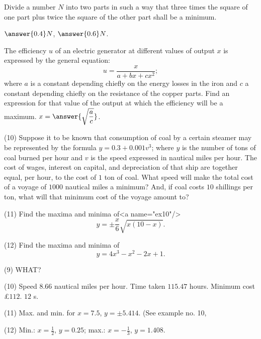\documentclass{ximera}
\begin{document}
\begin{problem} Divide a number $N$ into two parts in such a
way that three times the square of one part plus
twice the square of the other part shall be a
minimum.

$\answer{0.4}N$, $\answer{0.6}N$.
\end{problem}

\begin{problem}The efficiency $u$ of an electric generator at
different values of output $x$ is expressed by the
general equation:
\[
u=\frac{x}{a+bx+cx^2};
\]
where $a$ is a constant depending chiefly on the energy
losses in the iron and $c$ a constant depending chiefly
on the resistance of the copper parts. Find an expression
for that value of the output at which the
efficiency will be a maximum.
 $x = \answer{\sqrt{\dfrac{a}{c}}}$.
\end{problem}

(10) Suppose it to be known that consumption of
coal by a certain steamer may be represented by the
formula $y = 0.3 + 0.001v^3$; where $y$ is the number of
tons of coal burned per hour and $v$ is the speed
expressed in nautical miles per hour. The cost of
wages, interest on capital, and depreciation of that
ship are together equal, per hour, to the cost of
$1$ ton of coal. What speed will make the total cost
of a voyage of $1000$ nautical miles a minimum?
And, if coal costs $10$ shillings per ton, what will that
minimum cost of the voyage amount to?

(11) Find the maxima and minima of<a name="ex10"/>
\[
y = \pm\frac{x}{6}\sqrt{x(10-x)}.
\]

(12) Find the maxima and minima of
\[
y= 4x^3 - x^2 - 2x + 1.
\]


(9)  WHAT?

(10)   Speed $8.66$ nautical miles per hour. Time taken $115.47$ hours.
Minimum cost \pounds $112$. $12$ s.

(11)   Max. and min. for $x = 7.5$, $y = \pm5.414$. (See example
no. 10, 

(12)   Min.: $x = \frac{1}{2}$, $y= 0.25$; max.: $x = - \frac{1}{3}$, $y= 1.408$.
\end{document}
